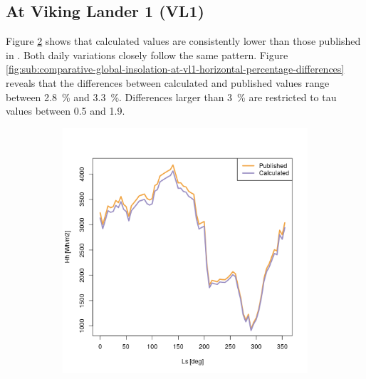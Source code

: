 \subsection{At Viking Lander 1 (VL1)}
Figure \ref{fig:sub:comparative-global-insolation-at-vl1-horizontal-daily-variations} shows that calculated values are consistently lower than those published in . Both daily variations closely follow the same pattern. Figure \ref{fig:sub:comparative-global-insolation-at-vl1-horizontal-percentage-differences} reveals that the differences between calculated and published values range between \SI{2.8}{\percent} and \SI{3.3}{\percent}. Differences larger than \SI{3}{\percent} are restricted to tau values between 0.5 and 1.9.

\begin{figure}[H]
\captionsetup[subfigure]{justification=centering}
\vspace{-2ex}
\centering
    \setlength{\subfigureWidth}{0.50\textwidth}
    \setlength{\graphicsHeight}{80mm}
    \hypersetup{hidelinks=true}%
    \begin{subfigure}[t]{\subfigureWidth}
        \centering
            \includegraphics[height=\graphicsHeight]{sections/appendix/A/plots/hh-exp-calc-at-vl1.png}
            \label{fig:sub:comparative-global-insolation-at-vl1-horizontal-daily-variations}

\end{subfigure}
\end{figure}
